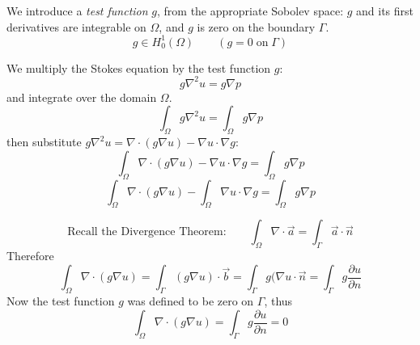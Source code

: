 \documentclass[a4paper]{report}
\begin{document}
\vspace{1em}
\begin{center}
\end{center}

We introduce a \emph{test function} $g$, from the appropriate Sobolev space:  $g$ and its first derivatives are integrable on $\Omega$, and $g$ is zero on the boundary $\Gamma$.
\begin{equation}
g \in H_0^1(\Omega) \qquad (g=0 \; \text{on} \; \Gamma)
\end{equation}

We multiply the Stokes equation by the test function $g$:
\begin{equation}
g \nabla^2 u = g \nabla p
\end{equation}
and integrate over the domain $\Omega$.
\begin{equation}
\int_{\Omega} g \nabla^2 u = \int_{\Omega} g \nabla p
\end{equation}
then substitute $g \nabla^2 u = \nabla \cdot (g \nabla u) - \nabla u \cdot \nabla g$:
\begin{equation}
\int_{\Omega} \nabla \cdot (g \nabla u) - \nabla u \cdot \nabla g  
= \int_{\Omega} g \nabla p
\end{equation}
\begin{equation}
\int_{\Omega} \nabla \cdot (g \nabla u) - \int_{\Omega} \nabla u \cdot \nabla g  
= \int_{\Omega} g \nabla p
\end{equation}

\begin{equation}
\text{Recall the Divergence Theorem:} \qquad
\int_{\Omega} \nabla \cdot \vec{a}  = \int_{\Gamma} \vec{a} \cdot \vec{n}
\end{equation}
Therefore
\begin{equation}
\int_{\Omega} \nabla \cdot (g \nabla u) = 
\int_{\Gamma} (g \nabla u) \cdot \vec{b} = \int_{\Gamma} g (\nabla u \cdot \vec{n}
= \int_{\Gamma} g \frac{\partial u}{\partial n}
\end{equation}
Now the test function $g$ was defined to be zero on $\Gamma$, thus
\begin{equation}
\int_{\Omega} \nabla \cdot (g \nabla u)
 = \int_{\Gamma} g \frac{\partial u}{\partial n} =0
\end{equation}
\end{document}
